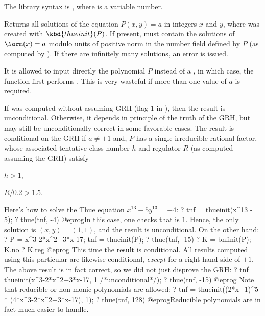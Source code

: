 The library syntax is , where  is a variable number.

\label{se:thue}
Returns all solutions of the equation
$P(x,y)=a$ in integers $x$ and $y$, where  was created with
$\kbd{thueinit}(P)$. If present,  must contain the solutions of
$\Norm(x)=a$ modulo units of positive norm in the number field
defined by $P$ (as computed by ). If there are infinitely
many solutions, an error is issued.

It is allowed to input directly the polynomial $P$ instead of a ,
in which case, the function first performs . This is
very wasteful if more than one value of $a$ is required.

If  was computed without assuming GRH (flag $1$ in ),
then the result is unconditional. Otherwise, it depends in principle of the
truth of the GRH, but may still be unconditionally correct in some
favorable cases. The result is conditional on the GRH if
$a\neq \pm 1$ and, $P$ has a single irreducible rational factor, whose
associated tentative class number $h$ and regulator $R$ (as computed
assuming the GRH) satisfy

\item $h > 1$,

\item $R/0.2 > 1.5$.

Here's how to solve the Thue equation $x^{13} - 5y^{13} = - 4$:
\bprog
? tnf = thueinit(x^13 - 5);
? thue(tnf, -4)
@eprog\noindent In this case, one checks that 
is $1$. Hence, the only solution is $(x,y) = (1,1)$, and the result is
unconditional. On the other hand:
\bprog
? P = x^3-2*x^2+3*x-17; tnf = thueinit(P);
? thue(tnf, -15)
? K = bnfinit(P); K.no
? K.reg
@eprog
This time the result is conditional. All results computed using this
particular  are likewise conditional, \emph{except} for a right-hand
side of $\pm 1$.
The above result is in fact correct, so we did not just disprove the GRH:
\bprog
? tnf = thueinit(x^3-2*x^2+3*x-17, 1 /*unconditional*/);
? thue(tnf, -15)
@eprog
Note that reducible or non-monic polynomials are allowed:
\bprog
? tnf = thueinit((2*x+1)^5 * (4*x^3-2*x^2+3*x-17), 1);
? thue(tnf, 128)
@eprog\noindent Reducible polynomials are in fact much easier to handle.


